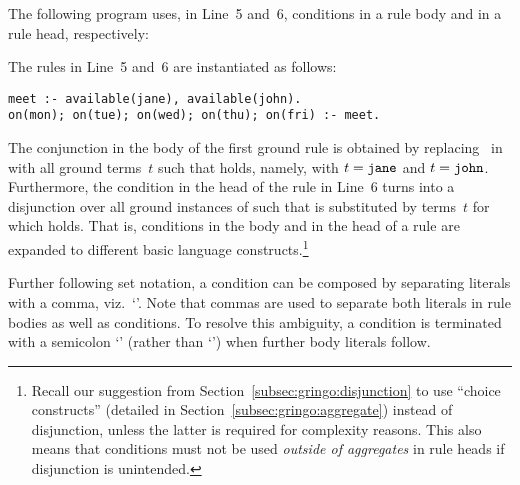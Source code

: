 \begin{example}\label{ex:cond}
The following program uses, in Line~5 and~6, conditions in a rule body and in a rule head, respectively:
%

%
The rules in Line~5 and~6 are instantiated as follows:%
\begin{lstlisting}[numbers=none]
meet :- available(jane), available(john).
on(mon); on(tue); on(wed); on(thu); on(fri) :- meet.
\end{lstlisting}
%
The conjunction in the body of the first ground rule is obtained by replacing~ in
 with all ground terms~$t$ such that
 holds, namely, with $t=\texttt{jane}$ and $t=\texttt{john}$.
Furthermore, the condition in the head of the rule in Line~6 turns into
a disjunction over all ground instances of
 such that  is substituted by terms~$t$
for which  holds.
That is, conditions in the body and in the head of a rule
are expanded to different basic language constructs.\footnote{%
Recall our suggestion from Section~\ref{subsec:gringo:disjunction}
to use ``choice constructs'' (detailed in Section~\ref{subsec:gringo:aggregate})
instead of disjunction, unless the latter is required for complexity reasons.
This also means that conditions must not be used \emph{outside of aggregates} in rule heads
if disjunction is unintended.}
\end{example}

Further following set notation,
a condition can be composed by separating literals with a comma, viz.~`\code{,}'.
Note that commas are used to separate both literals in rule bodies as well as conditions.
To resolve this ambiguity,
a condition is terminated with a semicolon `\code{;}' (rather than `\code{,}')
when further body literals follow.

